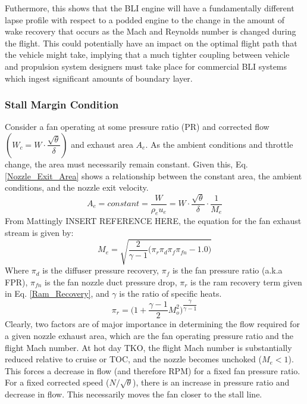 			Futhermore, this shows that the BLI engine will have a fundamentally different lapse profile with respect to a podded engine to the change in the amount of wake recovery that occurs as the Mach and Reynolds number is changed during the flight.  This could potentially have an impact on the optimal flight path that the vehicle might take, implying that a much tighter coupling between vehicle and propulsion system designers must take place for commercial BLI systems which ingest significant amounts of boundary layer.
			
		\subsubsection{Stall Margin Condition}			
			Consider a fan operating at some pressure ratio (PR) and corrected flow $(W_c = W \cdot \dfrac{\sqrt{\theta}}{\delta})$ and exhaust area $A_e$.  As the ambient conditions and throttle change, the area must necessarily remain constant.  Given this, Eq. \ref{Nozzle_Exit_Area} shows a relationship between the constant area, the ambient conditions, and the nozzle exit velocity.
			\begin{equation}
				A_e = constant = \frac{W}{\rho_e u_e} = W \cdot \dfrac{\sqrt{\theta}}{\delta} \cdot \frac{1}{M_e}
				\label{Nozzle_Exit_Area}
			\end{equation} 
			From Mattingly INSERT REFERENCE HERE, the equation for the fan exhaust stream is given by:
			\begin{equation}
				M_e = \sqrt{\frac{2}{\gamma-1}\Big(\pi_r \pi_d \pi_f \pi_{fn} - 1.0\Big)}
				\label{Fan_Nozzle_Exit_Mach}
			\end{equation}
			Where $\pi_d$ is the diffuser pressure recovery, $\pi_f$ is the fan pressure ratio (a.k.a FPR), $\pi_{fn}$ is the fan nozzle duct pressure drop, $\pi_r$ is the ram recovery term given in Eq. \ref{Ram_Recovery}, and $\gamma$ is the ratio of specific heats.
			\begin{equation}
				\pi_r = \Big(1 + \frac{\gamma-1}{2}M_o^2\Big)^{\dfrac{\gamma}{\gamma-1}}
				\label{Ram_Recovery}
			\end{equation}
			Clearly, two factors are of major importance in determining the flow required for a given nozzle exhaust area, which are the fan operating pressure ratio and the flight Mach number.  At hot day TKO, the flight Mach number is substantially reduced relative to cruise or TOC, and the nozzle becomes unchoked  ($M_e < 1$).  This forces a decrease in flow (and therefore RPM) for a fixed fan pressure ratio.  For a fixed corrected speed ($N/\sqrt{\theta}$), there is an increase in pressure ratio and decrease in flow.  This necessarily moves the fan closer to the stall line.  
			
